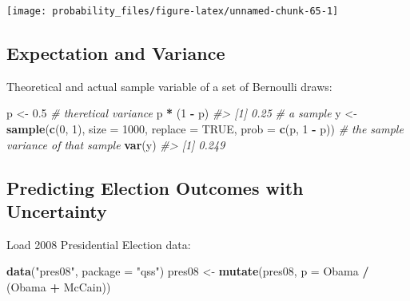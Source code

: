 \documentclass[]{book}
\newenvironment{Shaded}{\begin{snugshade}}{\end{snugshade}}
\newcommand{\CommentTok}[1]{\textcolor[rgb]{0.56,0.35,0.01}{\textit{#1}}}
\newcommand{\DataTypeTok}[1]{\textcolor[rgb]{0.13,0.29,0.53}{#1}}
\newcommand{\DecValTok}[1]{\textcolor[rgb]{0.00,0.00,0.81}{#1}}
\newcommand{\FloatTok}[1]{\textcolor[rgb]{0.00,0.00,0.81}{#1}}
\newcommand{\KeywordTok}[1]{\textcolor[rgb]{0.13,0.29,0.53}{\textbf{#1}}}
\newcommand{\NormalTok}[1]{#1}
\newcommand{\OperatorTok}[1]{\textcolor[rgb]{0.81,0.36,0.00}{\textbf{#1}}}
\newcommand{\OtherTok}[1]{\textcolor[rgb]{0.56,0.35,0.01}{#1}}
\newcommand{\StringTok}[1]{\textcolor[rgb]{0.31,0.60,0.02}{#1}}
\theoremstyle{definition}
\theoremstyle{definition}
\theoremstyle{definition}
\theoremstyle{remark}
\begin{document}
\begin{center}\texttt{[image: probability\_files/figure-latex/unnamed-chunk-65-1]} \end{center}

\hypertarget{expectation-and-variance}{%
\subsection{Expectation and Variance}\label{expectation-and-variance}}

Theoretical and actual sample variable of a set of Bernoulli draws:

\begin{Shaded}
\begin{Highlighting}[]
\NormalTok{p <-}\StringTok{ }\FloatTok{0.5}
\CommentTok{# theretical variance}
\NormalTok{p }\OperatorTok{*}\StringTok{ }\NormalTok{(}\DecValTok{1} \OperatorTok{-}\StringTok{ }\NormalTok{p)}
\CommentTok{#> [1] 0.25}
\CommentTok{# a sample}
\NormalTok{y <-}\StringTok{ }\KeywordTok{sample}\NormalTok{(}\KeywordTok{c}\NormalTok{(}\DecValTok{0}\NormalTok{, }\DecValTok{1}\NormalTok{), }\DataTypeTok{size =} \DecValTok{1000}\NormalTok{, }\DataTypeTok{replace =} \OtherTok{TRUE}\NormalTok{, }\DataTypeTok{prob =} \KeywordTok{c}\NormalTok{(p, }\DecValTok{1} \OperatorTok{-}\StringTok{ }\NormalTok{p))}
\CommentTok{# the sample variance of that sample}
\KeywordTok{var}\NormalTok{(y)}
\CommentTok{#> [1] 0.249}
\end{Highlighting}
\end{Shaded}

\hypertarget{predicting-election-outcomes-with-uncertainty-1}{%
\subsection{Predicting Election Outcomes with
Uncertainty}\label{predicting-election-outcomes-with-uncertainty-1}}

Load 2008 Presidential Election data:

\begin{Shaded}
\begin{Highlighting}[]
\KeywordTok{data}\NormalTok{(}\StringTok{"pres08"}\NormalTok{, }\DataTypeTok{package =} \StringTok{"qss"}\NormalTok{)}
\NormalTok{pres08 <-}\StringTok{ }\KeywordTok{mutate}\NormalTok{(pres08, }\DataTypeTok{p =}\NormalTok{ Obama }\OperatorTok{/}\StringTok{ }\NormalTok{(Obama }\OperatorTok{+}\StringTok{ }\NormalTok{McCain))}
\end{Highlighting}
\end{Shaded}
\end{document}
